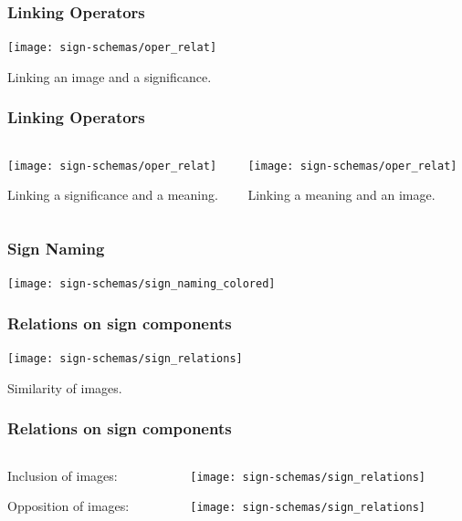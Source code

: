 \documentclass[default]{beamer}
\begin{document}
	\begin{frame}
		\frametitle{Linking Operators}
		\centering
		\texttt{[image: sign-schemas/oper\_relat]}
		
		Linking an image and a significance.
	\end{frame}		

	\begin{frame}
		\frametitle{Linking Operators}
		\begin{columns}
			\begin{column}{0.5\textwidth}
				\centering
				\texttt{[image: sign-schemas/oper\_relat]}
				
				Linking a significance and a meaning.
			\end{column}
			\begin{column}{0.5\textwidth}
				\centering
				\texttt{[image: sign-schemas/oper\_relat]}
				
				Linking a meaning and an image.
			\end{column}
		\end{columns}
	\end{frame}	
	
	\begin{frame}
		\frametitle{Sign Naming}
		\centering
		\texttt{[image: sign-schemas/sign\_naming\_colored]}
	\end{frame}		

	\begin{frame}
		\frametitle{Relations on sign components}
		\centering
		\texttt{[image: sign-schemas/sign\_relations]}
		
		Similarity of images.
	\end{frame}	

	\begin{frame}
		\frametitle{Relations on sign components}
		
		\begin{columns}
			\begin{column}{0.3\textwidth}
				\centering
				Inclusion of images: 
				\par\bigskip
				\par\bigskip
				\par\bigskip
				\par\bigskip
				\par\bigskip
				Opposition of images: 
				
			\end{column}
			\begin{column}{0.7\textwidth}
				\texttt{[image: sign-schemas/sign\_relations]}
				
				\texttt{[image: sign-schemas/sign\_relations]}
			\end{column}
		\end{columns}
		
	\end{frame}	
\end{document}
